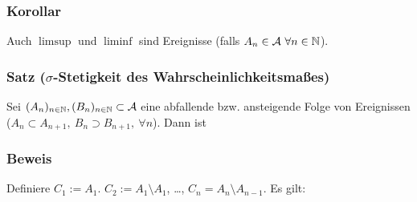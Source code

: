 \subsubsection{Korollar}
Auch $\limsup$ und $\liminf$ sind Ereignisse (falls $A_n\in\mathcal{A}\ \forall n\in\NN$).
\subsubsection{Satz ($\sigma$-Stetigkeit des Wahrscheinlichkeitsma\ss{}es)}
Sei $(A_n)_{n\in\mathbb{N}},(B_n)_{n\in\mathbb{N}}\subset\mathcal{A}$ eine abfallende bzw. ansteigende Folge von Ereignissen ($A_n\subset A_{n+1},\ B_n\supset B_{n+1},\ \forall n$). Dann ist
\subsubsection{Beweis}
Definiere $C_1:=A_1$. $C_2:=A_1\setminus A_1$, \ldots, $C_n=A_n\setminus A_{n-1}$. Es gilt:
